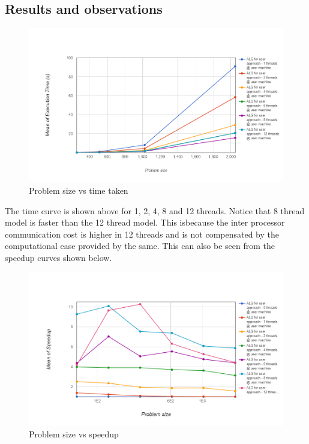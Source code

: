 \documentclass[12,a4paper]{article}
\begin{document}
    \subsection{Results and observations}
    \begin{figure}[H]
        \centering
        \includegraphics[width=\textwidth]{plots/mean_executionTime.png}
        \caption{Problem size vs time taken}
        \label{fig:my_label}
    \end{figure}
    The time curve is shown above for 1, 2, 4, 8 and 12 threads. Notice that 8 thread model is faster than the 12 thread model. This isbecause the inter processor communication cost is higher in 12 threads and is not compensated by the computational ease provided by the same. This can also be seen from the speedup curves shown below.
    \begin{figure}[H]
        \centering
        \includegraphics[width=\textwidth]{plots/mean_speedup.png}
        \caption{Problem size vs speedup}
        \label{fig:my_label}
    \end{figure}
\end{document}
